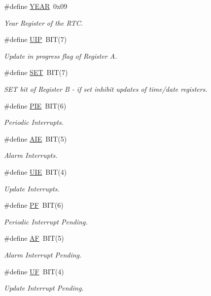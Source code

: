 \begin{DoxyCompactItemize}
\#define \hyperlink{group__rtc_ga5871356500f559add06ea81d60331b1b}{Y\+E\+AR}~0x09
\begin{DoxyCompactList}\small\item\em Year Register of the R\+TC. \end{DoxyCompactList}\item 
\#define \hyperlink{group__rtc_ga3289eebd69837790d4aacaccd18d46db}{U\+IP}~B\+IT(7)
\begin{DoxyCompactList}\small\item\em Update in progress flag of Register A. \end{DoxyCompactList}\item 
\#define \hyperlink{group__rtc_ga59da1d65e87a723efe808dbabb4fc205}{S\+ET}~B\+IT(7)
\begin{DoxyCompactList}\small\item\em S\+ET bit of Register B -\/ if set inhibit updates of time/date registers. \end{DoxyCompactList}\item 
\#define \hyperlink{group__rtc_gac40c2b49eb51e2adc237b530adfcadf4}{P\+IE}~B\+IT(6)
\begin{DoxyCompactList}\small\item\em Periodic Interrupts. \end{DoxyCompactList}\item 
\#define \hyperlink{group__rtc_ga113847820d539c6a6836993b84d22800}{A\+IE}~B\+IT(5)
\begin{DoxyCompactList}\small\item\em Alarm Interrupts. \end{DoxyCompactList}\item 
\#define \hyperlink{group__rtc_ga2c276876faf62c1b29fe2383ce4ccfda}{U\+IE}~B\+IT(4)
\begin{DoxyCompactList}\small\item\em Update Interrupts. \end{DoxyCompactList}\item 
\#define \hyperlink{group__rtc_gaa0e278c26c25558741febfadd7216caa}{PF}~B\+IT(6)
\begin{DoxyCompactList}\small\item\em Periodic Interrupt Pending. \end{DoxyCompactList}\item 
\#define \hyperlink{group__rtc_ga76ba789cde9c36cd57dbb390bdee7661}{AF}~B\+IT(5)
\begin{DoxyCompactList}\small\item\em Alarm Interrupt Pending. \end{DoxyCompactList}\item 
\#define \hyperlink{group__rtc_ga2657a76f02e47fa3f3320fa9c6353f31}{UF}~B\+IT(4)
\begin{DoxyCompactList}\small\item\em Update Interrupt Pending. \end{DoxyCompactList}\end{DoxyCompactItemize}
